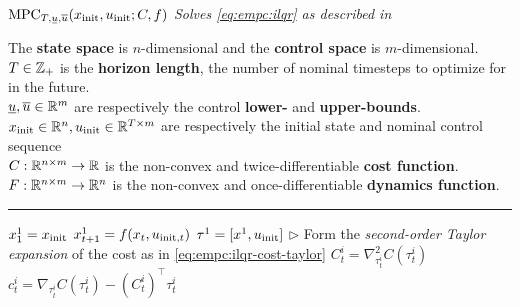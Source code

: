 \begin{algorithm}[H]
  \footnotesize
\caption{$\mathrm{MPC}_{T,\stackunder[1.2pt]{\scriptsize
      $u$}{\rule{0.8ex}{0.075ex}},\overline{u}}(\xinit, \uinit; C, f)$ \hfill
\emph{Solves \cref{eq:empc:ilqr} as described
  in \cite{tassa2014control}}}
\label{alg:mpc}
The \textbf{state space} is $n$-dimensional
and the \textbf{control space} is $m$-dimensional. \\
$T\in\mathbb{Z}_+$ is the \textbf{horizon length}, the number of
nominal timesteps to optimize for in the future. \\
$\underline{u},\overline{u}\in\mathbb{R}^m$ are respectively
  the control \textbf{lower-} and \textbf{upper-bounds}. \\
$x_{\rm init}\in\mathbb{R}^n,u_{\rm init}\in\mathbb{R}^{T\times m}$ are respectively the initial
  state and nominal control sequence \\
$C: \mathbb{R}^{n\times m} \rightarrow \mathbb{R}$ is the non-convex
  and twice-differentiable \textbf{cost function}. \\
$F: \mathbb{R}^{n\times m} \rightarrow \mathbb{R}^n$ is the non-convex
  and once-differentiable \textbf{dynamics function}.
\hrule
\begin{algorithmic}
  \State $x_1^1 = x_{\rm init}$
  \State $x_{t+1}^1 = f(x_t, u_{{\rm init},t})$
  \EndFor
  \State $\tau^1 = [x^1, u_{\rm init}]$
  \State
    \State \(\triangleright\) Form the \emph{second-order Taylor expansion} of the
    cost as in \cref{eq:empc:ilqr-cost-taylor}
    \State $C_t^i = \nabla_{\tau_t^i}^2 C(\tau_t^i)$
    \State $c_t^i = \nabla_{\tau_t^i} C(\tau_t^i) - (C_t^i)^\top  \tau_t^i$


\end{algorithmic}
\end{algorithm}
